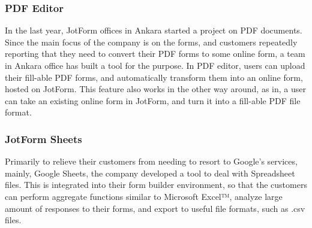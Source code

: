 \subsubsection{PDF Editor}
In the last year, JotForm offices in Ankara started a project on PDF documents. Since the main focus of the company is on the forms, and customers repeatedly reporting that they need to convert their PDF forms to some online form, a team in Ankara office has built a tool for the purpose. In PDF editor, users can upload their fill-able PDF forms, and automatically transform them into an online form, hosted on JotForm. This feature also works in the other way around, as in, a user can take an existing online form in JotForm, and turn it into a fill-able PDF file format.

\subsubsection{JotForm Sheets}
Primarily to relieve their customers from needing to resort to Google's services, mainly, Google Sheets, the company developed a tool to deal with Spreadsheet files.
This is integrated into their form builder environment, so that the customers can perform aggregate functions similar to Microsoft Excel™, analyze large amount of responses to their forms, and export to useful file formats, such as .csv files.